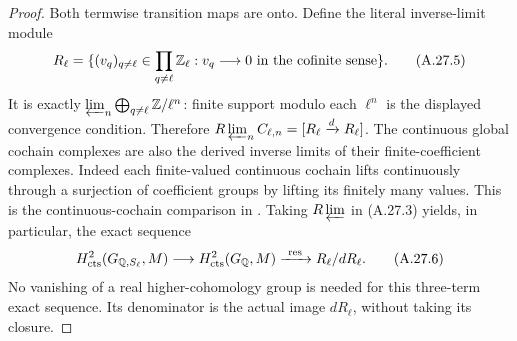 \begin{proof}
Both termwise transition maps are onto. Define the literal
inverse-limit module
\[
 R_\ell=
 \{(v_q)_{q\ne\ell}\in\prod_{q\ne\ell}\mathbb Z_\ell:
       v_q\longrightarrow0\text{ in the cofinite sense}\}.
 \tag{A.27.5}
\]
It is exactly $\varprojlim_n\bigoplus_{q\ne\ell}\mathbb Z/\ell^n$:
finite support modulo each $\ell^n$ is the displayed
convergence condition. Therefore
$R\varprojlim_n C_{\ell,n}=[R_\ell\xrightarrow d R_\ell]$.
The continuous global cochain complexes are also the derived
inverse limits of their finite-coefficient complexes. Indeed
each finite-valued continuous cochain lifts continuously
through a surjection of coefficient groups by lifting its
finitely many values. This is the continuous-cochain comparison
in \cite[(1.6), (2.1), Theorem (2.2)]{BIR_Jannsen1988}.
Taking $R\varprojlim$ in (A.27.3) yields, in particular, the
exact sequence
\[
 H^2_{\mathrm{cts}}(G_{\mathbb Q,S_\ell},M)
 \longrightarrow H^2_{\mathrm{cts}}(G_\mathbb Q,M)
 \xrightarrow{\ \mathrm{res}\ } R_\ell/dR_\ell.
 \tag{A.27.6}
\]
No vanishing of a real higher-cohomology group is needed for
this three-term exact sequence. Its denominator is the actual
image $dR_\ell$, without taking its closure.


\end{proof}
